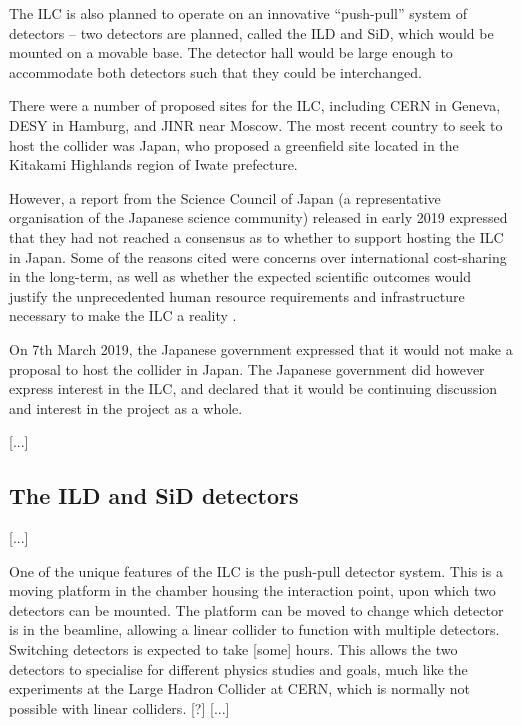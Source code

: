The ILC is also planned to operate on an innovative ``push-pull'' system of detectors -- two detectors are planned, called the \acrfull{ILD} and \acrfull{SiD}, which would be mounted on a movable base. The detector hall would be large enough to accommodate both detectors such that they could be interchanged.

There were a number of proposed sites for the ILC, including CERN in Geneva, DESY in Hamburg, and \acrshort{JINR} near Moscow. The most recent country to seek to host the collider was Japan, who proposed a greenfield site located in the Kitakami Highlands region of Iwate prefecture. 

However, a report from the Science Council of Japan (a representative organisation of the Japanese science community) released in early 2019 expressed that they had not reached a consensus as to whether to support hosting the ILC in Japan. Some  of the reasons cited were concerns over international cost-sharing in the long-term, as well as whether the expected scientific outcomes would justify the unprecedented human resource requirements and infrastructure necessary to make the ILC a reality \cite{linearcolliders-scj-report}.

On 7th March 2019, the Japanese government expressed that it would not make a proposal to host the collider in Japan. The Japanese government did however express interest in the ILC, and declared that it would be continuing discussion and interest in the project as a whole.



[...]

\subsection{The ILD and SiD detectors}
[...]

One of the unique features of the ILC is the push-pull detector system. This is a moving platform in the chamber housing the interaction point, upon which two detectors can be mounted. The platform can be moved to change which detector is in the beamline, allowing a linear collider to function with multiple detectors. Switching detectors is expected to take [some] hours. This allows the two detectors to specialise for different physics studies and goals, much like the experiments at the Large Hadron Collider at CERN, which is normally not possible with linear colliders. [?] [...]


